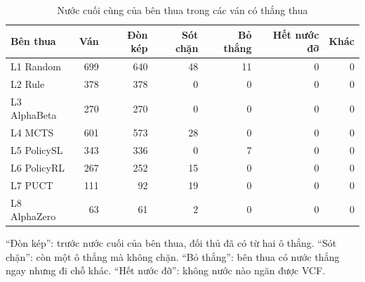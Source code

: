 \begin{table}[H]
  \centering
  \footnotesize
  \caption{Nước cuối cùng của bên thua trong các ván có thắng thua}
  \label{tab:cs-nuoc-ketthuc}
  \begin{tabular}{lrrrrrr}
    \toprule
    Bên thua & Ván & Đòn kép & Sót chặn & Bỏ thắng & Hết nước đỡ & Khác \\
    \midrule
    L1 Random & 699 & 640 & 48 & 11 & 0 & 0 \\
    L2 Rule & 378 & 378 & 0 & 0 & 0 & 0 \\
    L3 AlphaBeta & 270 & 270 & 0 & 0 & 0 & 0 \\
    L4 MCTS & 601 & 573 & 28 & 0 & 0 & 0 \\
    L5 PolicySL & 343 & 336 & 0 & 7 & 0 & 0 \\
    L6 PolicyRL & 267 & 252 & 15 & 0 & 0 & 0 \\
    L7 PUCT & 111 & 92 & 19 & 0 & 0 & 0 \\
    L8 AlphaZero & 63 & 61 & 2 & 0 & 0 & 0 \\
    \bottomrule
  \end{tabular}
  \par\smallskip\parbox{.95\linewidth}{\footnotesize ``Đòn kép'': trước nước cuối của bên thua, đối thủ đã có từ hai ô thắng. ``Sót chặn'': còn một ô thắng mà không chặn. ``Bỏ thắng'': bên thua có nước thắng ngay nhưng đi chỗ khác. ``Hết nước đỡ'': không nước nào ngăn được VCF.}
\end{table}
